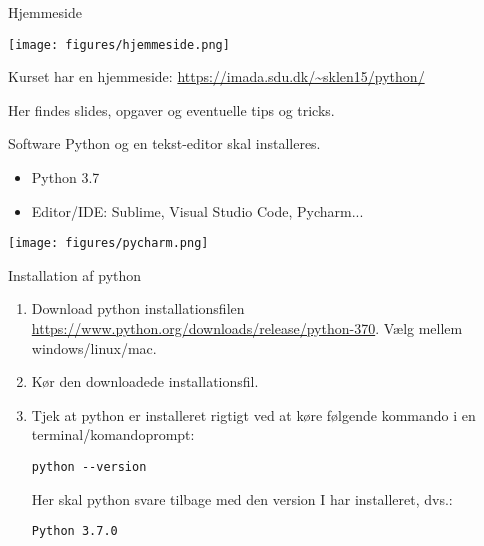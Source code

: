 \begin{frame}[fragile]{Hjemmeside}
	\begin{center}
		\texttt{[image: figures/hjemmeside.png]}
	\end{center}
	Kurset har en hjemmeside: \url{https://imada.sdu.dk/~sklen15/python/}

	Her findes slides, opgaver og eventuelle tips og tricks.	
\end{frame}

\begin{frame}{Software}
	Python og en tekst-editor skal installeres.
	\begin{itemize}
		\item Python 3.7
		\item Editor/IDE: Sublime, Visual Studio Code, Pycharm...
	\end{itemize}
	\begin{center}
		\texttt{[image: figures/pycharm.png]}
	\end{center}
\end{frame}

\begin{frame}[fragile]{Installation af python}
	\begin{enumerate}
		\item Download python installationsfilen \url{https://www.python.org/downloads/release/python-370}. Vælg mellem windows/linux/mac.
		\item Kør den downloadede installationsfil.
		\item Tjek at python er installeret rigtigt ved at køre følgende kommando i en terminal/komandoprompt: 
		\begin{lstlisting}[style=terminal]
python --version
		\end{lstlisting}
		Her skal python svare tilbage med den version I har installeret, dvs.:
				\begin{lstlisting}[style=terminal]
Python 3.7.0
		\end{lstlisting}
	\end{enumerate}
\end{frame}

